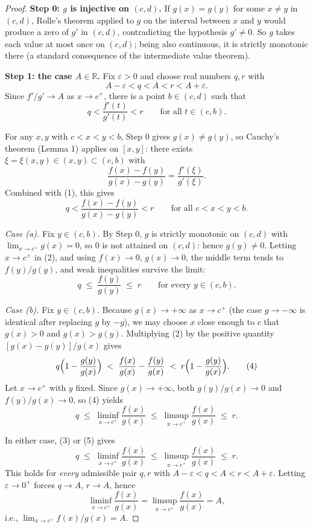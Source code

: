 \documentclass{essay}
\begin{document}
\begin{proof}
  \textbf{Step 0: \(g\) is injective on \((c,d)\).} If \(g(x)=g(y)\) for some \(x\neq y\) in \((c,d)\), Rolle's theorem applied to \(g\) on the interval between \(x\) and \(y\) would produce a zero of \(g'\) in \((c,d)\), contradicting the hypothesis \(g'\neq 0\). So \(g\) takes each value at most once on \((c,d)\); being also continuous, it is strictly monotonic there (a standard consequence of the intermediate value theorem).

  \medskip
  \textbf{Step 1: the case \(A\in\mathbb{R}\).} Fix \(\varepsilon>0\) and choose real numbers \(q,r\) with
  \[ A-\varepsilon < q < A < r < A+\varepsilon. \]
  Since \(f'/g'\to A\) as \(x\to c^+\), there is a point \(b\in(c,d)\) such that
  \[ q < \frac{f'(t)}{g'(t)} < r \qquad \text{for all } t\in(c,b). \tag{1} \]

  For any \(x,y\) with \(c<x<y<b\), Step 0 gives \(g(x)\neq g(y)\), so Cauchy's theorem (Lemma 1) applies on \([x,y]\): there exists \(\xi=\xi(x,y)\in(x,y)\subset(c,b)\) with
  \[ \frac{f(x)-f(y)}{g(x)-g(y)} = \frac{f'(\xi)}{g'(\xi)}. \]
  Combined with (1), this gives
  \[ q < \frac{f(x)-f(y)}{g(x)-g(y)} < r \qquad \text{for all } c<x<y<b. \tag{2} \]

  \emph{Case (a).} Fix \(y\in(c,b)\). By Step 0, \(g\) is strictly monotonic on \((c,d)\) with \(\lim_{x\to c^+}g(x)=0\), so \(0\) is not attained on \((c,d)\): hence \(g(y)\neq 0\). Letting \(x\to c^+\) in (2), and using \(f(x)\to 0\), \(g(x)\to 0\), the middle term tends to \(f(y)/g(y)\), and weak inequalities survive the limit:
  \[ q \;\le\; \frac{f(y)}{g(y)} \;\le\; r \qquad \text{for every } y\in(c,b). \tag{3} \]

  \emph{Case (b).} Fix \(y\in(c,b)\). Because \(g(x)\to+\infty\) as \(x\to c^+\) (the case \(g\to-\infty\) is identical after replacing \(g\) by \(-g\)), we may choose \(x\) close enough to \(c\) that \(g(x)>0\) and \(g(x)>g(y)\). Multiplying (2) by the positive quantity \([g(x)-g(y)]/g(x)\) gives
  \[ q\Bigl(1-\frac{g(y)}{g(x)}\Bigr) \;<\; \frac{f(x)}{g(x)} - \frac{f(y)}{g(x)} \;<\; r\Bigl(1-\frac{g(y)}{g(x)}\Bigr). \tag{4} \]
  Let \(x\to c^+\) with \(y\) fixed. Since \(g(x)\to+\infty\), both \(g(y)/g(x)\to 0\) and \(f(y)/g(x)\to 0\), so (4) yields
  \[ q \;\le\; \liminf_{x\to c^+}\frac{f(x)}{g(x)} \;\le\; \limsup_{x\to c^+}\frac{f(x)}{g(x)} \;\le\; r. \tag{5} \]

  In either case, (3) or (5) gives
  \[ q \;\le\; \liminf_{x\to c^+}\frac{f(x)}{g(x)} \;\le\; \limsup_{x\to c^+}\frac{f(x)}{g(x)} \;\le\; r. \]
  This holds for \emph{every} admissible pair \(q,r\) with \(A-\varepsilon<q<A<r<A+\varepsilon\). Letting \(\varepsilon\to 0^+\) forces \(q\to A\), \(r\to A\), hence
  \[ \liminf_{x\to c^+}\frac{f(x)}{g(x)} = \limsup_{x\to c^+}\frac{f(x)}{g(x)} = A, \]
  i.e., \(\displaystyle\lim_{x\to c^+} f(x)/g(x) = A\).


\end{proof}
\end{document}
